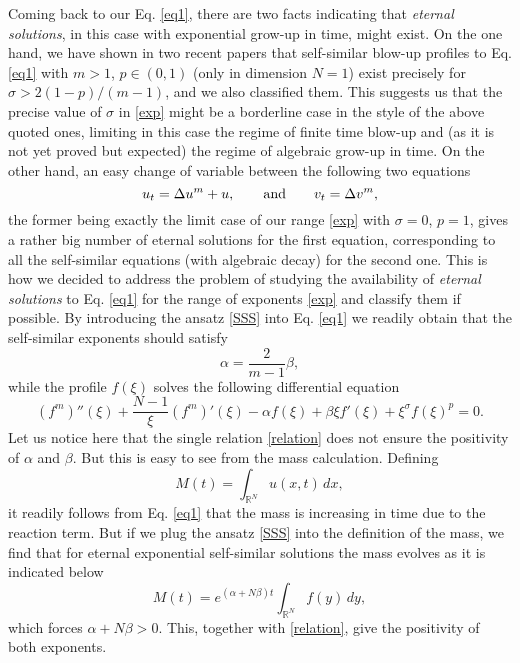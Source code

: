 \documentclass[a4paper,11pt]{article}
\numberwithin{equation}{section}
\newcommand{\real}{\mathbb{R}}
\begin{document}
Coming back to our Eq. \eqref{eq1}, there are two facts indicating that \emph{eternal solutions}, in this case with exponential grow-up in time, might exist. On the one hand, we have shown in two recent papers \cite{IS20b, IS21b} that self-similar blow-up profiles to Eq. \eqref{eq1} with $m>1$, $p\in(0,1)$ (only in dimension $N=1$) exist precisely for $\sigma>2(1-p)/(m-1)$, and we also classified them. This suggests us that the precise value of $\sigma$ in \eqref{exp} might be a borderline case in the style of the above quoted ones, limiting in this case the regime of finite time blow-up and (as it is not yet proved but expected) the regime of algebraic grow-up in time. On the other hand, an easy change of variable between the following two equations
$$
u_t=\Delta u^m+u, \qquad {\rm and} \qquad v_t=\Delta v^m,
$$
the former being exactly the limit case of our range \eqref{exp} with $\sigma=0$, $p=1$, gives a rather big number of eternal solutions for the first equation, corresponding to all the self-similar equations (with algebraic decay) for the second one. This is how we decided to address the problem of studying the availability of \emph{eternal solutions} to Eq. \eqref{eq1} for the range of exponents \eqref{exp} and classify them if possible. By introducing the ansatz \eqref{SSS} into Eq. \eqref{eq1} we readily obtain that the self-similar exponents should satisfy
\begin{equation}\label{relation}
\alpha=\frac{2}{m-1}\beta,
\end{equation}
while the profile $f(\xi)$ solves the following differential equation
\begin{equation}\label{ODE}
(f^m)''(\xi)+\frac{N-1}{\xi}(f^m)'(\xi)-\alpha f(\xi)+\beta\xi f'(\xi)+\xi^{\sigma}f(\xi)^p=0.
\end{equation}
Let us notice here that the single relation \eqref{relation} does not ensure the positivity of $\alpha$ and $\beta$. But this is easy to see from the mass calculation. Defining
$$
M(t)=\int_{\real^N}u(x,t)\,dx,
$$
it readily follows from Eq. \eqref{eq1} that the mass is increasing in time due to the reaction term. But if we plug the ansatz \eqref{SSS} into the definition of the mass, we find that for eternal exponential self-similar solutions the mass evolves as it is indicated below
$$
M(t)=e^{(\alpha+N\beta)t}\int_{\real^N}f(y)\,dy,
$$
which forces $\alpha+N\beta>0$. This, together with \eqref{relation}, give the positivity of both exponents.
\end{document}
